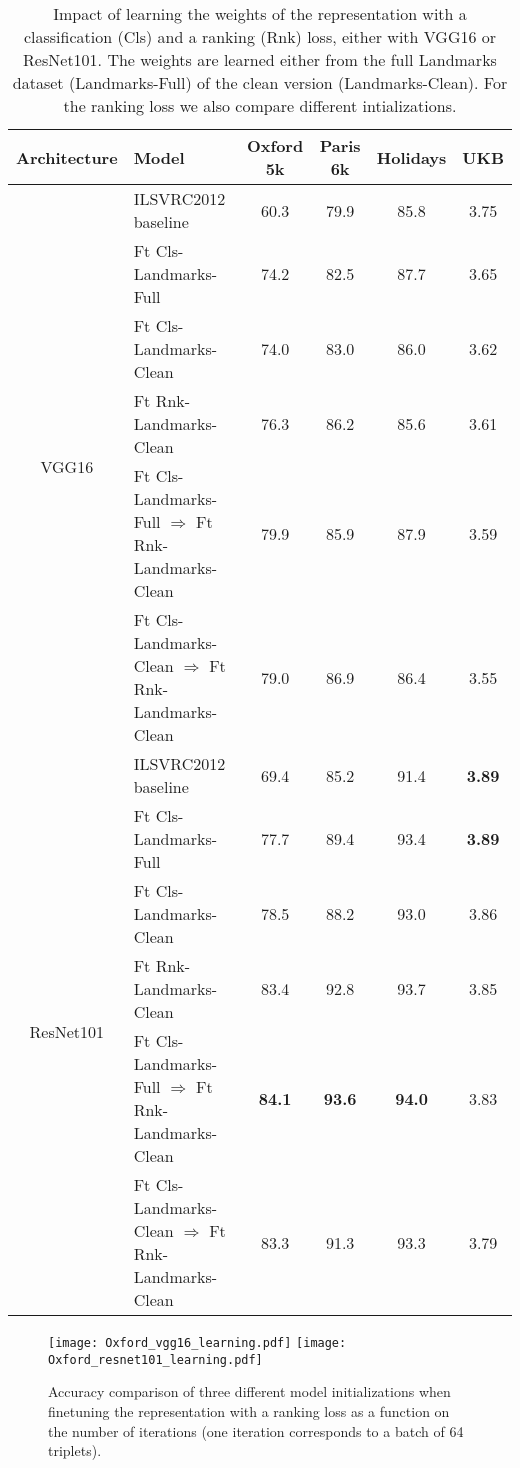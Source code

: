 \documentclass[twocolumn]{svjour3}          \smartqed  \usepackage{graphicx}
\begin{document}
\begin{table*}[t!]
    \caption{Impact of learning the weights of the representation with a classification (Cls) and a ranking (Rnk) loss, either with VGG16 or ResNet101. The weights are learned either from the full Landmarks dataset (Landmarks-Full) of the clean version (Landmarks-Clean). For the ranking loss we also compare different intializations.}
\centering
\begin{tabular}{clcccc}
\toprule
Architecture & Model & Oxford 5k & Paris 6k & Holidays & UKB \\
\midrule
\multirow{6}{*}{VGG16} & ILSVRC2012 baseline & 60.3 & 79.9 & 85.8 & 3.75 \\
\cline{2-6} 
    & Ft Cls-Landmarks-Full & 74.2 & 82.5  & 87.7 & 3.65 \\
    & Ft Cls-Landmarks-Clean & 74.0 & 83.0 & 86.0 & 3.62 \\
\cline{2-6} 
    & Ft Rnk-Landmarks-Clean & 76.3 & 86.2 & 85.6 & 3.61   \\
    & Ft Cls-Landmarks-Full $\Rightarrow$  Ft Rnk-Landmarks-Clean & 79.9 & 85.9 & 87.9 & 3.59 \\
    & Ft Cls-Landmarks-Clean $\Rightarrow$  Ft Rnk-Landmarks-Clean & 79.0 & 86.9 & 86.4 & 3.55  \\
\midrule
\multirow{6}{*}{ResNet101} & ILSVRC2012 baseline & 69.4 & 85.2 & 91.4 & \textbf{3.89} \\
\cline{2-6} 
    & Ft Cls-Landmarks-Full & 77.7 & 89.4 & 93.4 & \textbf{3.89} \\
    & Ft Cls-Landmarks-Clean  &  78.5  & 88.2 & 93.0 & 3.86  \\
\cline{2-6} 
    & Ft Rnk-Landmarks-Clean  & 83.4 & 92.8 & 93.7 & 3.85\\    
    & Ft Cls-Landmarks-Full $\Rightarrow$  Ft Rnk-Landmarks-Clean & \textbf{84.1} & \textbf{93.6} & \textbf{94.0} & 3.83  \\
    & Ft Cls-Landmarks-Clean $\Rightarrow$  Ft Rnk-Landmarks-Clean & 83.3 & 91.3 & 93.3 & 3.79  \\
\bottomrule
\end{tabular}
\label{tab:ml}
\end{table*}









\begin{figure}[t!]
\begin{centering}
\texttt{[image: Oxford\_vgg16\_learning.pdf]}
\texttt{[image: Oxford\_resnet101\_learning.pdf]}
\par\end{centering}
\caption{\label{fig:learning} Accuracy comparison of three different model initializations when finetuning the representation with a ranking loss as a function on the number of iterations (one iteration corresponds to a batch of 64 triplets).}
\end{figure}
\end{document}
